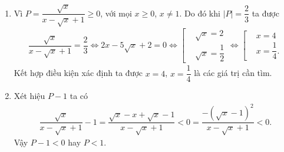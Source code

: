 \begin{bt}
{\begin{enumerate}
			Khi đó $P = \dfrac{\sqrt{x}}{x-\sqrt{x}+1} \geq 0$, với mọi $x\geq 0$, $x \neq 1$.\\
			Đẳng thức xảy ra khi $x=0$.\\
			Vậy giá trị nhỏ nhất của $P$ bằng $0$ khi $x=0$.
			\item Vì $P = \dfrac{\sqrt{x}}{x-\sqrt{x}+1} \geq 0$, với mọi $x\geq 0$, $x \neq 1$. Do đó khi $|P|=\dfrac{2}{3}$ ta được
			\allowdisplaybreaks
			\begin{eqnarray*}
				\dfrac{\sqrt{x}}{x-\sqrt{x}+1} = \dfrac{2}{3} \Leftrightarrow 2x-5\sqrt{x}+2=0 \Leftrightarrow \left[\begin{aligned}
					&\sqrt{x}=2 \\&\sqrt{x}=\dfrac{1}{2}\end{aligned}\right. \Leftrightarrow \left[\begin{aligned}
					&x=4 \\&x=\dfrac{1}{4}.\end{aligned}\right.
			\end{eqnarray*}
			Kết hợp điều kiện xác định ta được $x=4$, $x=\dfrac{1}{4}$ là các giá trị cần tìm.
			\item Xét hiệu $P - 1$ ta có
			\allowdisplaybreaks
			\begin{eqnarray*}
				\dfrac{\sqrt{x}}{x-\sqrt{x}+1} - 1 = \dfrac{\sqrt{x}-x+\sqrt{x}-1}{x-\sqrt{x}+1}<0 = \dfrac{-\left(\sqrt{x}-1\right)^2}{x-\sqrt{x}+1}<0.
			\end{eqnarray*}
			Vậy $P-1<0$ hay $P<1$.
		\end{enumerate}
	}
\end{bt}

